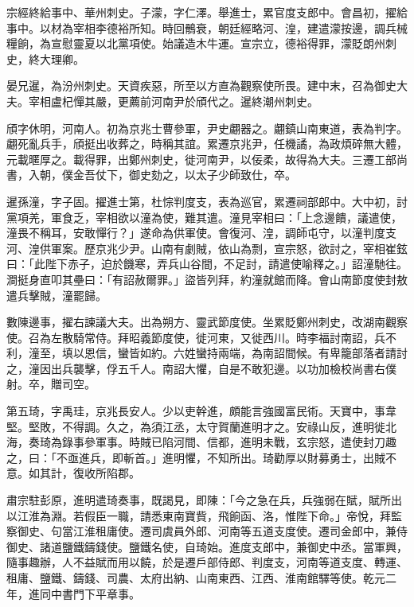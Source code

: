 \begin{pinyinscope}
 宗經終給事中、華州刺史。子濛，字仁澤。舉進士，累官度支郎中。會昌初，擢給事中。以材為宰相李德裕所知。時回鶻衰，朝廷經略河、湟，建遣濛按邊，調兵械糧餉，為宣慰靈夏以北黨項使。始議造木牛運。宣宗立，德裕得罪，濛貶朗州刺史，終大理卿。



 晏兄暹，為汾州刺史。天資疾惡，所至以方直為觀察使所畏。建中末，召為御史大夫。宰相盧杞憚其嚴，更薦前河南尹於頎代之。暹終潮州刺史。



 頎字休明，河南人。初為京兆士曹參軍，尹史翽器之。翽鎮山南東道，表為判字。翽死亂兵手，頎挺出收葬之，時稱其誼。累遷京兆尹，任機譎，為政煩碎無大體，元載暱厚之。載得罪，出鄭州刺史，徙河南尹，以佞柔，故得為大夫。三遷工部尚書，入朝，僕金吾仗下，御史劾之，以太子少師致仕，卒。



 暹孫潼，字子固。擢進士第，杜悰判度支，表為巡官，累遷祠部郎中。大中初，討黨項羌，軍食乏，宰相欲以潼為使，難其遣。潼見宰相曰：「上念邊饋，議遣使，潼畏不稱耳，安敢憚行？」遂命為供軍使。會復河、湟，調師屯守，以潼判度支河、湟供軍案。歷京兆少尹。山南有劇賊，依山為剽，宣宗怒，欲討之，宰相崔鉉曰：「此陛下赤子，迫於饑寒，弄兵山谷間，不足討，請遣使喻釋之。」詔潼馳往。澗挺身直叩其壘曰：「有詔赦爾罪。」盜皆列拜，約潼就館而降。會山南節度使封敖遣兵擊賊，潼罷歸。



 數陳邊事，擢右諫議大夫。出為朔方、靈武節度使。坐累貶鄭州刺史，改湖南觀察使。召為左散騎常侍。拜昭義節度使，徙河東，又徙西川。時李福討南詔，兵不利，潼至，填以恩信，蠻皆如約。六姓蠻持兩端，為南詔間候。有卑籠部落者請討之，潼因出兵襲擊，俘五千人。南詔大懼，自是不敢犯邊。以功加檢校尚書右僕射。卒，贈司空。



 第五琦，字禹珪，京兆長安人。少以吏幹進，頗能言強國富民術。天寶中，事韋堅。堅敗，不得調。久之，為須江丞，太守賀蘭進明才之。安祿山反，進明徙北海，奏琦為錄事參軍事。時賊已陷河間、信都，進明未戰，玄宗怒，遣使封刀趣之，曰：「不亟進兵，即斬首。」進明懼，不知所出。琦勸厚以財募勇士，出賊不意。如其計，復收所陷郡。



 肅宗駐彭原，進明遣琦奏事，既謁見，即陳：「今之急在兵，兵強弱在賦，賦所出以江淮為淵。若假臣一職，請悉東南寶貲，飛餉函、洛，惟陛下命。」帝悅，拜監察御史、句當江淮租庸使。遷司虞員外郎、河南等五道支度使。遷司金郎中，兼侍御史、諸道鹽鐵鑄錢使。鹽鐵名使，自琦始。進度支郎中，兼御史中丞。當軍興，隨事趣辦，人不益賦而用以饒，於是遷戶部侍郎、判度支，河南等道支度、轉運、租庸、鹽鐵、鑄錢、司農、太府出納、山南東西、江西、淮南館驛等使。乾元二年，進同中書門下平章事。




\end{pinyinscope}
